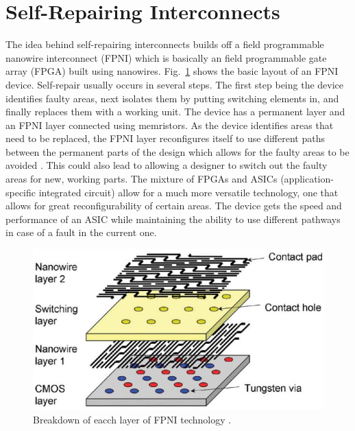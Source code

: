 \documentclass[conference]{IEEEtran}
\begin{document}
\section{Self-Repairing Interconnects}
The idea behind self-repairing interconnects builds off a field programmable nanowire interconnect (FPNI)
which is basically an field programmable gate array (FPGA) built using nanowires. Fig.~\ref{fig:fpni}
shows the basic layout of an FPNI device. Self-repair usually occurs in several steps. The first step
being the device identifies faulty areas, next isolates them by putting switching elements in, and finally
replaces them with a working unit. The device has a permanent layer and an FPNI layer connected
using memristors. As the device identifies areas that need to be replaced, the FPNI layer reconfigures itself
to use different paths between the permanent parts of the design which allows for the faulty areas to be
avoided \cite{8423678}. This could also lead to allowing a designer to switch out the faulty areas for new,
working parts. The mixture of FPGAs and ASICs (application-specific integrated circuit) allow for a much
more versatile technology, one that allows for great reconfigurability of certain areas. The device gets
the speed and performance of an ASIC while maintaining the ability to
use different pathways in case of a fault in the current one.
\begin{figure}[!htb]
    \centering
    \includegraphics[width=\linewidth]{figures/fpni.png}
    \caption{Breakdown of eacch layer of FPNI technology \cite{8423678}.}\label{fig:fpni}
\end{figure}
\end{document}

